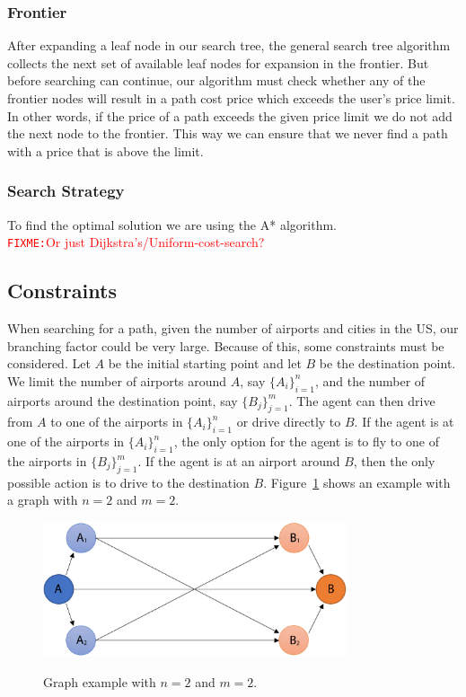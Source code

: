 \documentclass[11pt]{article}
\newcommand{\FIXME}[1]{ \ \\ \hspace* {-1.5 cm}
  \textcolor{red}{\texttt{FIXME:}#1} \medskip\par}
\begin{document}
\subsubsection{Frontier}

After expanding a leaf node in our search tree, the general search tree algorithm collects the next set of available leaf nodes for expansion in the frontier. But before searching can continue, our algorithm must check whether any of the frontier nodes will result in a path cost price which exceeds the user's price limit. In other words, if the price of a path exceeds the given price limit we do not add the next node to the frontier. This way we can ensure that we never find a path with a price that is above the limit.

\subsubsection{Search Strategy}
To find the optimal solution we are using the A* algorithm.
\FIXME{Or just Dijkstra's/Uniform-cost-search?} 

\subsection{Constraints}
When searching for a path, given the number of airports and cities in the US, our branching factor could be very large. Because of this, some constraints must be considered. Let $A$ be the initial starting point and let $B$ be the destination point. We limit the number of airports around $A$, say $\{ A_i \}_{i=1}^n$, and the number of airports around the destination point, say $\{ B_j \}_{j=1}^m$. The agent can then drive from $A$ to one of the airports in $\{ A_i \}_{i=1}^n$ or drive directly to $B$. If the agent is at one of the airports in $\{ A_i \}_{i=1}^n$, the only option for the agent is to fly to one of the airports in $\{ B_j \}_{j=1}^m$. If the agent is at an airport around $B$, then the only possible action is to drive to the destination $B$. Figure~\ref{fig:graph_example} shows an example with a graph with $n = 2$ and $m = 2$.
\begin{figure}[!ht]
  \caption{Graph example with $n=2$ and $m=2$.}
  \centering
  \includegraphics[width=0.8\textwidth]{Graph_example_n2}
  \label{fig:graph_example}
\end{figure}
\end{document}

